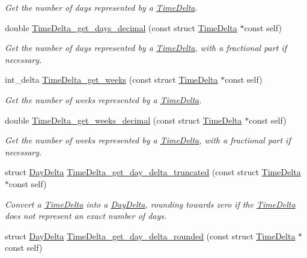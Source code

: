 \begin{DoxyCompactItemize}
\begin{DoxyCompactList}\small\item\em \-Get the number of days represented by a \hyperlink{structTimeDelta}{\-Time\-Delta}. \end{DoxyCompactList}\item 
double \hyperlink{time-delta_8h_a1cd230549ae6fbd0329212e2da4f3477}{\-Time\-Delta\-\_\-get\-\_\-days\-\_\-decimal} (const struct \hyperlink{structTimeDelta}{\-Time\-Delta} $\ast$const self)
\begin{DoxyCompactList}\small\item\em \-Get the number of days represented by a \hyperlink{structTimeDelta}{\-Time\-Delta}, with a fractional part if necessary. \end{DoxyCompactList}\item 
int\-\_\-delta \hyperlink{time-delta_8h_ac0d5f3dc0f6ce1d76c9addf0ef23a01f}{\-Time\-Delta\-\_\-get\-\_\-weeks} (const struct \hyperlink{structTimeDelta}{\-Time\-Delta} $\ast$const self)
\begin{DoxyCompactList}\small\item\em \-Get the number of weeks represented by a \hyperlink{structTimeDelta}{\-Time\-Delta}. \end{DoxyCompactList}\item 
double \hyperlink{time-delta_8h_a17b67c52a855f556cb84371f83ade7cf}{\-Time\-Delta\-\_\-get\-\_\-weeks\-\_\-decimal} (const struct \hyperlink{structTimeDelta}{\-Time\-Delta} $\ast$const self)
\begin{DoxyCompactList}\small\item\em \-Get the number of weeks represented by a \hyperlink{structTimeDelta}{\-Time\-Delta}, with a fractional part if necessary. \end{DoxyCompactList}\item 
struct \hyperlink{structDayDelta}{\-Day\-Delta} \hyperlink{time-delta_8h_a22e42b82fef74a330b892197c3fe4586}{\-Time\-Delta\-\_\-get\-\_\-day\-\_\-delta\-\_\-truncated} (const struct \hyperlink{structTimeDelta}{\-Time\-Delta} $\ast$const self)
\begin{DoxyCompactList}\small\item\em \-Convert a \hyperlink{structTimeDelta}{\-Time\-Delta} into a \hyperlink{structDayDelta}{\-Day\-Delta}, rounding towards zero if the \hyperlink{structTimeDelta}{\-Time\-Delta} does not represent an exact number of days. \end{DoxyCompactList}\item 
struct \hyperlink{structDayDelta}{\-Day\-Delta} \hyperlink{time-delta_8h_aae6864e3044344d9f27dab1bf22cb33c}{\-Time\-Delta\-\_\-get\-\_\-day\-\_\-delta\-\_\-rounded} (const struct \hyperlink{structTimeDelta}{\-Time\-Delta} $\ast$const self)

\end{DoxyCompactItemize}

